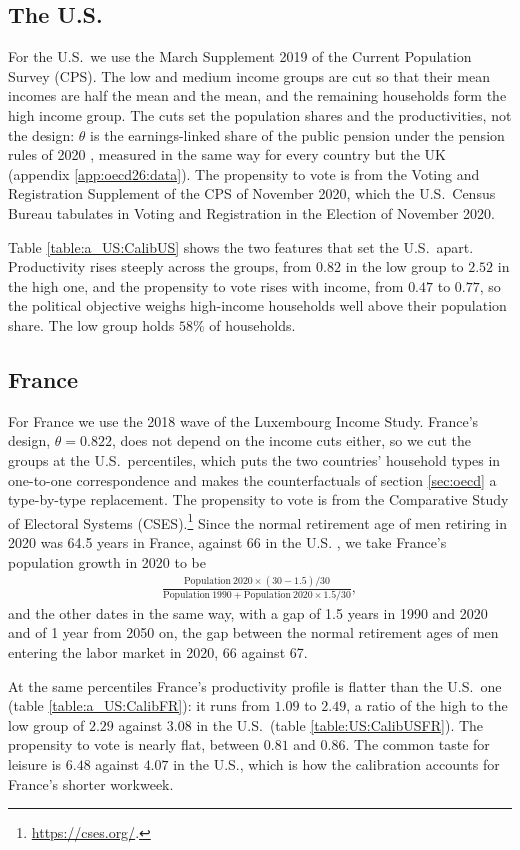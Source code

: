 \subsection{The U.S.}
For the U.S.\ we use the March Supplement 2019 of the Current Population Survey (CPS). The low and medium income groups are cut so that their mean incomes are half the mean and the mean, and the remaining households form the high income group. The cuts set the population shares and the productivities, not the design: $\theta$ is the earnings-linked share of the public pension under the pension rules of 2020 \parencite{OECDpen}, measured in the same way for every country but the UK (appendix \ref{app:oecd26:data}). The propensity to vote is from the Voting and Registration Supplement of the CPS of November 2020, which the U.S.\ Census Bureau tabulates in Voting and Registration in the Election of November 2020.

Table \ref{table:a_US:CalibUS} shows the two features that set the U.S.\ apart. Productivity rises steeply across the groups, from $0.82$ in the low group to $2.52$ in the high one, and the propensity to vote rises with income, from $0.47$ to $0.77$, so the political objective weighs high-income households well above their population share. The low group holds $58\%$ of households.



\FloatBarrier
\subsection{France}
For France we use the 2018 wave of the Luxembourg Income Study. France's design, $\theta = 0.822$, does not depend on the income cuts either, so we cut the groups at the U.S.\ percentiles, which puts the two countries' household types in one-to-one correspondence and makes the counterfactuals of section \ref{sec:oecd} a type-by-type replacement. The propensity to vote is from the Comparative Study of Electoral Systems (CSES).\footnote{\url{https://cses.org/}.} Since the normal retirement age of men retiring in 2020 was 64.5 years in France, against 66 in the U.S. \parencite[figure 3.7]{OECDpen}, we take France's population growth in 2020 to be
\begin{align*}
\frac{\mathrm{Population}\ 2020 \times (30-1.5)/30}{\mathrm{Population}\ 1990 + \mathrm{Population}\ 2020 \times 1.5/30},
\end{align*}
and the other dates in the same way, with a gap of 1.5 years in 1990 and 2020 and of 1 year from 2050 on, the gap between the normal retirement ages of men entering the labor market in 2020, 66 against 67.

At the same percentiles France's productivity profile is flatter than the U.S.\ one (table \ref{table:a_US:CalibFR}): it runs from $1.09$ to $2.49$, a ratio of the high to the low group of $2.29$ against $3.08$ in the U.S.\ (table \ref{table:US:CalibUSFR}). The propensity to vote is nearly flat, between $0.81$ and $0.86$. The common taste for leisure is $6.48$ against $4.07$ in the U.S., which is how the calibration accounts for France's shorter workweek.


